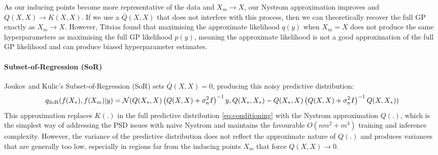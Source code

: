 As our inducing points become more representative of the data and $X_m \to X$, our Nystrom approximation improves and $Q(X, X) \to K(X, X)$. If we use a $\bar{Q}(X, X)$ that does not interfere with this process, then we can theoretically recover the full GP exactly as $X_m \to X$. However, Titsias \cite{vfe} found that maximising the approximate likelihood $q(y)$ when $X_m = X$ does not produce the same hyperparameters as maximising the full GP likelihood $p(y)$, meaning the approximate likelihood is not a good approximation of the full GP likelihood and can produce biased hyperparameter estimates.

\paragraph{Subset-of-Regression (SoR)}
Joukov and Kulic's Subset-of-Regression (SoR) \cite{sor} sets $\bar{Q}(X, X) = 0$, producing this noisy predictive distribution:
\begin{equation*}
    q_{\text{SoR}}(f(X_*), f(X_m) | y) = \mathcal{N}( \\
        Q(X_*, X) \left( Q(X, X) + \sigma_n^2 I \right)^{-1} y, \\
        Q(X_*, X_*) - Q(X_*, X) \left( Q(X, X) + \sigma_n^2 I \right)^{-1} Q(X, X_*)
    )
\end{equation*}
This approximation replaces $K(.)$ in the full predictive distribution \ref{eq:conditioning} with the Nystrom approximation $Q(.)$, which is the simplest way of addressing the PSD issues with naive Nystrom and maintains the favourable $O(nm^2 + m^3)$ training and inference complexity.  However, the variance of the predictive distribution does not reflect the approximate nature of $Q(.)$ and produces variances that are generally too low, especially in regions far from the inducing points $X_m$ \cite{big-data} that force $Q(X, X) \to 0$.

